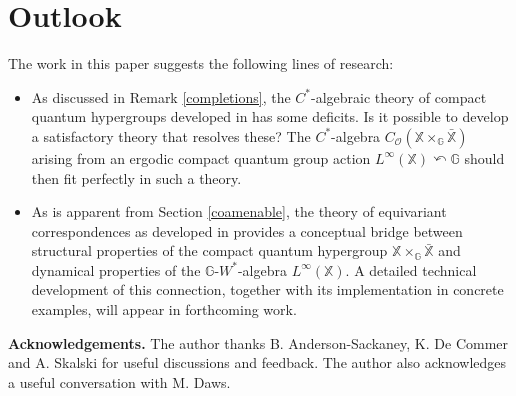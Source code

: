 \documentclass[reqno]{amsart}
\numberwithin{equation}{section}
\newcommand\XGX{\X\times_\G \bar{\X}}
\newcommand{\mcO}{\mathcal{O}}
\newcommand{\G}{\mathbb{G}}
\newcommand{\X}{\mathbb{X}}
\begin{document}
\section{Outlook} The work in this paper suggests the following lines of research:
\begin{itemize}
    \item As discussed in Remark \ref{completions}, the $C^*$-algebraic theory of compact quantum hypergroups developed in \cite{CV99} has some deficits. Is it possible to develop a satisfactory theory that resolves these? The $C^*$-algebra $C_\mcO(\XGX)$ arising from an ergodic compact quantum group action $L^\infty(\X)\curvearrowleft \G$ should then fit perfectly in such a theory.
    \item As is apparent from Section \ref{coamenable}, the theory of equivariant correspondences as developed in \cites{DCDR24, DCDR25} provides a conceptual bridge between structural properties of the compact quantum hypergroup $\XGX$ and dynamical properties of the $\G$-$W^*$-algebra $L^\infty(\X)$. A detailed technical development of this connection, together with its implementation in concrete examples, will appear in forthcoming work.
\end{itemize}

\textbf{Acknowledgements.} The author thanks B. Anderson-Sackaney, K. De Commer and A. Skalski for useful discussions and feedback. The author also acknowledges a useful conversation with M. Daws.
\end{document}
